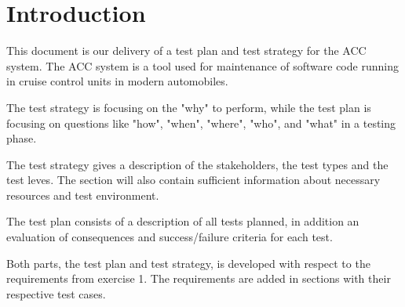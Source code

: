 \chapter{Introduction}

	This document is our delivery of a test plan and test strategy for the ACC system. 
	The ACC system is a tool used for maintenance of software code running in cruise 
	control units in modern automobiles. 

	The test strategy is focusing on the "why" to perform, while the test plan is 
	focusing on questions like "how", "when", "where", "who", and "what" in a testing phase. 

	The test strategy gives a description of the stakeholders, the test types and the
	test leves. The section will also contain sufficient information about 
	necessary resources and test environment. 

	The test plan consists of a description of all tests planned, in addition 
	an evaluation of consequences and success/failure criteria for each test. 

	Both parts, the test plan and test strategy, is developed with respect to the 
	requirements from exercise 1. The requirements are added in sections with their 
	respective test cases. 